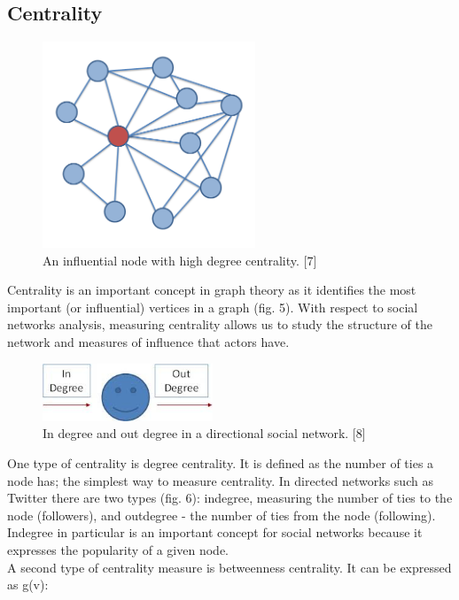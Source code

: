 \documentclass[conference,letterpaper]{IEEEtran}
\begin{document}
\subsection{Centrality}
\begin{center}
\begin{figure}[hb]
\centering
\includegraphics[width=2.5in]{ego_network}
\caption{
An influential node with high degree centrality. [7]
}
\label{fig_sim}
\end{figure}
\end{center}
\indent
Centrality is an important concept in graph theory as it identifies the most important (or influential)
vertices in a graph (fig. 5). With respect to social networks analysis, measuring centrality allows us to
study the structure of the network and measures of influence that actors have.\\
\begin{center}
\begin{figure}[hb]
\centering
\includegraphics[width=2.0in]{degree_centrality}
\caption{
In degree and out degree in a directional social network. [8]
}
\label{fig_sim}
\end{figure}
\end{center}
\indent
One type of centrality is degree centrality. It is defined as the number of ties a node has; the simplest
way to measure centrality. In directed networks such as Twitter there are two types (fig. 6): indegree,
measuring the number of ties to the node (followers), and outdegree - the number of ties from the node
(following). Indegree in particular is an important concept for social networks because it expresses
the popularity of a given node. \\
\indent
A second type of centrality measure is betweenness centrality. It can be expressed as g(v):
\end{document}
